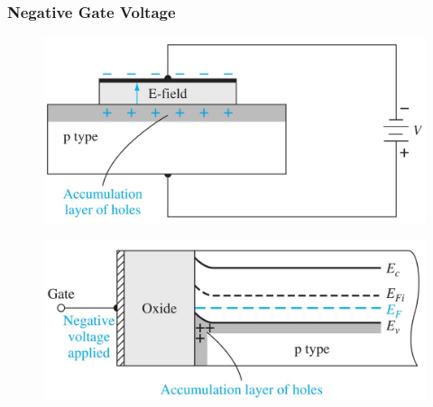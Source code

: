 \documentclass{beamer}
\begin{document}
    \begin{frame} \frametitle{Negative Gate Voltage}
        \begin{minipage}{\linewidth}
            \begin{minipage}{0.45\linewidth}
                \begin{figure}[H]
                    \centering
                    \includegraphics[width=\linewidth]{PMOS-negative-gate-voltage.jpg}
                    \label{fig:PMOS-negative-gate-voltage.jpg}
                \end{figure}
            \end{minipage}
            \begin{minipage}{0.45\linewidth}
                \begin{figure}[H]
                    \centering
                    \includegraphics[width=\linewidth]{PMOS-negative-gate-voltage-energy-band-diagram.jpg}
                    \label{fig:PMOS-negative-gate-voltage-energy-band-diagram.jpg}
                \end{figure}
            \end{minipage}
        \end{minipage}
    \end{frame}
\end{document}
